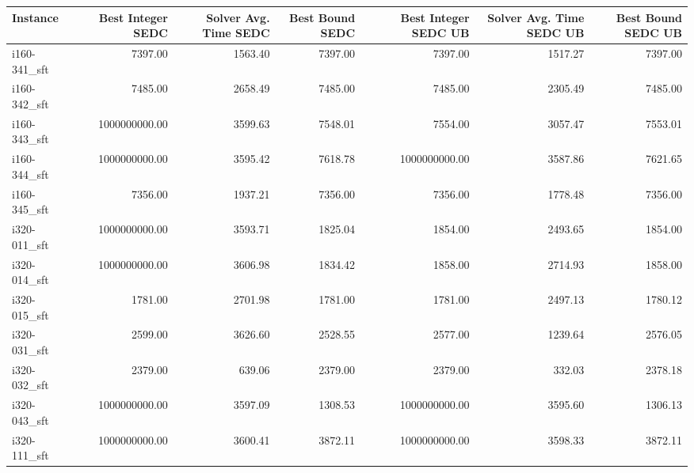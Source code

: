 \begin{tabular}{lrrrrrr}
\toprule
Instance &  Best Integer SEDC &  Solver Avg. Time SEDC &  Best Bound SEDC &  Best Integer SEDC UB &  Solver Avg. Time SEDC UB &  Best Bound SEDC UB \\
\midrule
i160-341\_sft &            7397.00 &                1563.40 &          7397.00 &               7397.00 &                   1517.27 &             7397.00 \\
i160-342\_sft &            7485.00 &                2658.49 &          7485.00 &               7485.00 &                   2305.49 &             7485.00 \\
i160-343\_sft &      1000000000.00 &                3599.63 &          7548.01 &               7554.00 &                   3057.47 &             7553.01 \\
i160-344\_sft &      1000000000.00 &                3595.42 &          7618.78 &         1000000000.00 &                   3587.86 &             7621.65 \\
i160-345\_sft &            7356.00 &                1937.21 &          7356.00 &               7356.00 &                   1778.48 &             7356.00 \\
i320-011\_sft &      1000000000.00 &                3593.71 &          1825.04 &               1854.00 &                   2493.65 &             1854.00 \\
i320-014\_sft &      1000000000.00 &                3606.98 &          1834.42 &               1858.00 &                   2714.93 &             1858.00 \\
i320-015\_sft &            1781.00 &                2701.98 &          1781.00 &               1781.00 &                   2497.13 &             1780.12 \\
i320-031\_sft &            2599.00 &                3626.60 &          2528.55 &               2577.00 &                   1239.64 &             2576.05 \\
i320-032\_sft &            2379.00 &                 639.06 &          2379.00 &               2379.00 &                    332.03 &             2378.18 \\
i320-043\_sft &      1000000000.00 &                3597.09 &          1308.53 &         1000000000.00 &                   3595.60 &             1306.13 \\
i320-111\_sft &      1000000000.00 &                3600.41 &          3872.11 &         1000000000.00 &                   3598.33 &             3872.11 \\

\end{tabular}
